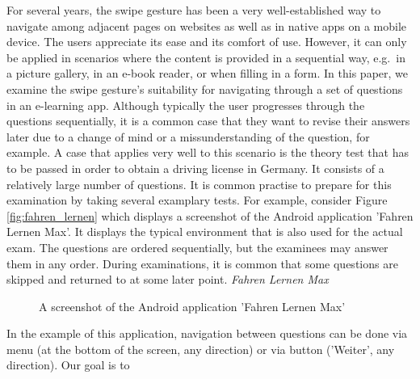 \documentclass{sig-alternate-05-2015}
\begin{document}
For several years, the swipe gesture has been a very well-established way to
navigate among adjacent pages on websites as well as in native apps on a
mobile device. The users appreciate its ease and its comfort of use. However,
it can only be applied in scenarios where the content is provided in a
sequential way, e.g.\ in a picture gallery, in an e-book reader, or when
filling in a form. In this paper, we examine the swipe gesture's suitability
for navigating through a set of questions in an e-learning app. Although
typically the user progresses through the questions sequentially, it is a
common case that they want to revise their answers later due to a change of
mind or a missunderstanding of the question, for example. A case that applies very
well to this scenario is the theory test that has to be passed in order to obtain
a driving license in Germany. It consists of a relatively large number of questions.
It is common practise to prepare for this examination by taking several examplary tests. 
For example, consider Figure \ref{fig:fahren_lernen} which displays a screenshot of the
Android application 'Fahren Lernen Max'. It displays the typical environment that
is also used for the actual exam. The questions are ordered sequentially, but the examinees
may answer them in any order. During examinations, it is common that some questions are
skipped and returned to at some later point.
\emph{Fahren Lernen Max}
\begin{figure}
  \caption{A screenshot of the Android application 'Fahren Lernen Max'}
\end{figure}
In the example of this application, navigation between questions can be done via menu (at the
bottom of the screen, any direction) or via button ('Weiter', any direction). Our goal is to
\end{document}
